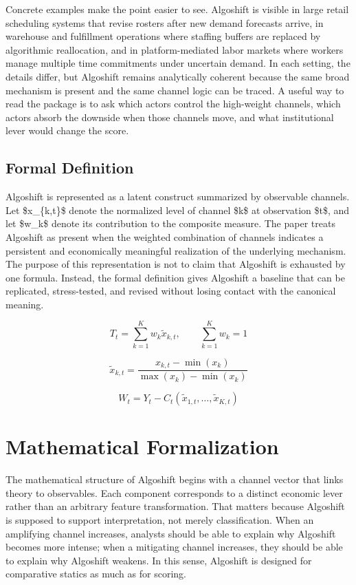 \documentclass[12pt]{article}
\begin{document}
Concrete examples make the point easier to see. Algoshift is visible in large retail scheduling systems that revise rosters after new demand forecasts arrive, in warehouse and fulfillment operations where staffing buffers are replaced by algorithmic reallocation, and in platform-mediated labor markets where workers manage multiple time commitments under uncertain demand. In each setting, the details differ, but Algoshift remains analytically coherent because the same broad mechanism is present and the same channel logic can be traced. A useful way to read the package is to ask which actors control the high-weight channels, which actors absorb the downside when those channels move, and what institutional lever would change the score.

\subsection{Formal Definition}
Algoshift is represented as a latent construct summarized by observable channels. Let \$x\_\{k,t\}\$ denote the normalized level of channel \$k\$ at observation \$t\$, and let \$w\_k\$ denote its contribution to the composite measure. The paper treats Algoshift as present when the weighted combination of channels indicates a persistent and economically meaningful realization of the underlying mechanism. The purpose of this representation is not to claim that Algoshift is exhausted by one formula. Instead, the formal definition gives Algoshift a baseline that can be replicated, stress-tested, and revised without losing contact with the canonical meaning.

\begin{equation}
T_t = \sum_{k=1}^K w_k \tilde{x}_{k,t}, \qquad \sum_{k=1}^K w_k = 1
\label{eq:index}
\end{equation}

\begin{equation}
\tilde{x}_{k,t} = \frac{x_{k,t} - \min(x_k)}{\max(x_k) - \min(x_k)}
\label{eq:norm}
\end{equation}

\begin{equation}
W_t = Y_t - C_t(\tilde{x}_{1,t}, \dots, \tilde{x}_{K,t})
\label{eq:welfare}
\end{equation}

\section{Mathematical Formalization}
The mathematical structure of Algoshift begins with a channel vector that links theory to observables. Each component corresponds to a distinct economic lever rather than an arbitrary feature transformation. That matters because Algoshift is supposed to support interpretation, not merely classification. When an amplifying channel increases, analysts should be able to explain why Algoshift becomes more intense; when a mitigating channel increases, they should be able to explain why Algoshift weakens. In this sense, Algoshift is designed for comparative statics as much as for scoring.
\end{document}
